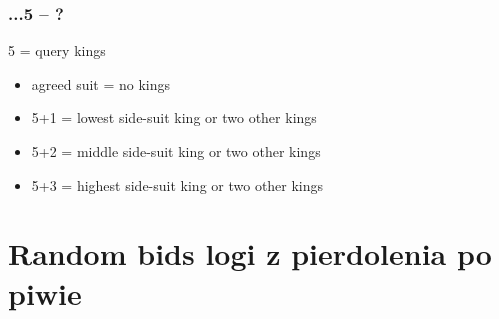 \documentclass[12pt, a4paper]{article}
\begin{document}
\subsubsection*{...5 -- ?}
5 = query kings
\begin{itemize}
    \item agreed suit = no kings
    \item 5+1 = lowest side-suit king or two other kings
    \item 5+2 = middle side-suit king or two other kings
    \item 5+3 = highest side-suit king or two other kings
\end{itemize}



\section{Random bids {\color{anti-flashwhite}logi z pierdolenia po piwie}}
\end{document}
